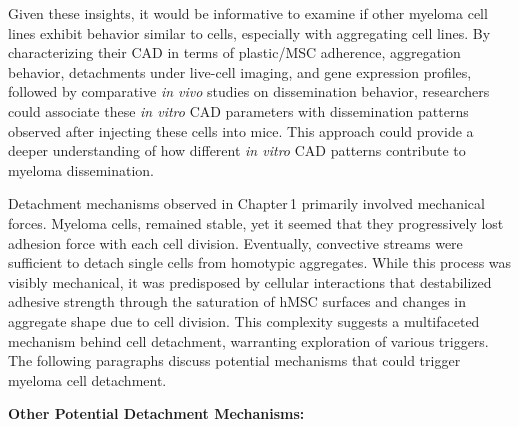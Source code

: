 Given these insights, it would be informative to examine if other myeloma cell
lines exhibit behavior similar to \INA cells, especially with aggregating cell
lines. By characterizing their \ac{CAD} in terms of plastic/MSC adherence,
aggregation behavior, detachments under live-cell imaging, and gene expression
profiles, followed by comparative \textit{in vivo} studies on dissemination
behavior, researchers could associate these \textit{in vitro} \ac{CAD}
parameters with dissemination patterns observed after injecting these cells into
mice. This approach could provide a deeper understanding of how different
\textit{in vitro} \ac{CAD} patterns contribute to myeloma dissemination.



\unnsubsection{\caddtriggertitle}%
\label{sec:discussion_caddtrigger}%
Detachment mechanisms observed in Chapter\,1 primarily involved mechanical
forces. Myeloma cells,  remained stable,
yet it seemed that they progressively lost adhesion force with each cell
division. Eventually, convective streams were sufficient to detach single \INA
cells from homotypic aggregates. While this process was visibly mechanical, it
was predisposed by cellular interactions that destabilized adhesive strength
through the saturation of hMSC surfaces and changes in aggregate shape due to
cell division. This complexity suggests a multifaceted mechanism behind cell
detachment, warranting exploration of various triggers. The following paragraphs
discuss potential mechanisms that could trigger myeloma cell detachment.

\noindent\textbf{Other Potential Detachment Mechanisms:}%

